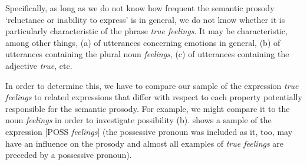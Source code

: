 Specifically, as long as we do not know how frequent the semantic  prosody `reluctance or inability to express' is in general, we do not know whether it is particularly characteristic of the phrase \textit{true feelings}.  It may be characteristic, among other things, (a) of utterances concerning emotions in general, (b) of utterances containing the plural  noun  \textit{feelings}, (c) of utterances containing the adjective  \textit{true}, etc.

In order to determine this, we have to compare our sample of the expression \textit{true feelings} to related expressions that differ with respect to each property potentially responsible for the semantic  prosody. For example, we might compare it to the noun  \textit{feelings}  in order to investigate possibility (b).  shows a sample of the expression [POSS \textit{feelings}] (the possessive  pronoun  was included as it, too, may have an influence on the prosody and almost all examples of \textit{true feelings} are preceded by a possessive pronoun).

